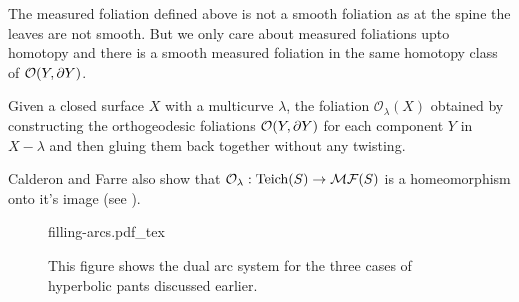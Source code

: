\begin{rem}
  The measured foliation defined above is not a smooth foliation as at the spine the leaves are not smooth. But we only care about measured foliations upto homotopy and there is a smooth measured foliation in the same homotopy class of $ \mathcal{O}(Y,\partial Y)$.
\end{rem}
\begin{definition}
  Given a closed surface $X$ with a multicurve $\lambda$, the foliation $ \mathcal{O}_\lambda(X)$ obtained by constructing the orthogeodesic foliations $ \mathcal{O}(Y, \partial Y)$ for each component $Y$ in $X-\lambda$ and then gluing them back together without any twisting. 
\end{definition}
Calderon and Farre also show that $ \mathcal{O}_\lambda : \text{Teich}(S) \to \mathcal{MF}(S)$ is a homeomorphism onto it's image (see \cite{farre}).\\

\begin{figure}[h]
\centering
\def\svgwidth{0.8\textwidth}
{filling-arcs.pdf_tex}
\caption[Dual arc system of Pants]{This figure shows the dual arc system for the three cases of hyperbolic pants discussed earlier.}
\label{fig:dual-arc}
\end{figure}
